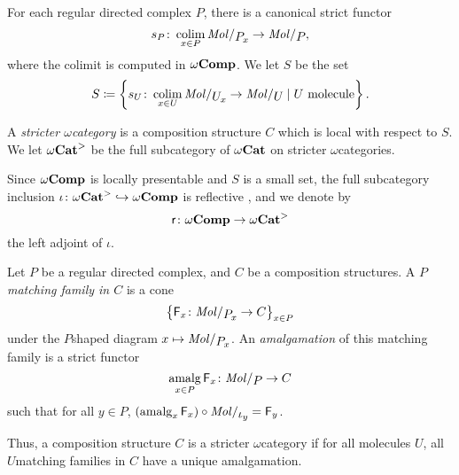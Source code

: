 \begin{dfn}
    For each regular directed complex \( P \), there is a canonical strict functor
    \begin{equation*}
        s_P \colon \colim_{x \in P} \molecin{\imel{P}{x}} \to \molecin{P},
    \end{equation*}
    where the colimit is computed in \( \omega\mathbf{Comp} \).
    We let \( S \) be the set
    \begin{equation*}
        S \eqdef \set{s_U \colon \colim_{x \in U} \molecin{\imel{U}{x}} \to \molecin{U} \mid U \text{ molecule}}.
    \end{equation*}
\end{dfn}

\begin{dfn}
    A \emph{stricter \( \omega \)\nbd category} is a composition structure \( C \) which is local with respect to \( S \).
    We let \( {\omega\mathbf{Cat}}^> \) be the full subcategory of \( {\omega\mathbf{Cat}} \) on stricter \( \omega \)\nbd categories.
\end{dfn}

\noindent Since \( \omega\mathbf{Comp} \) is locally presentable and \( S \) is a small set, the full subcategory inclusion \( \iota \colon {\omega\mathbf{Cat}}^> \hookrightarrow \omega\mathbf{Comp} \) is reflective \cite{freyd1972continuous}, and we denote by 
\begin{equation*}
    \mathsf{r} \colon \omega\mathbf{Comp} \to {\omega\mathbf{Cat}}^>
\end{equation*}
the left adjoint of \( \iota \).

\begin{dfn} 
    Let \( P \) be a regular directed complex, and \( C \) be a composition structures.
    A \emph{\( P \)\nbd matching family in \( C \)} is a cone 
    \begin{equation*}
        \set{\F_x \colon \molecin{\imel{P}{x}} \to C}_{x \in P}
    \end{equation*}
    under the \( P \)\nbd shaped diagram \( x \mapsto \molecin{\imel{P}{x}} \).    
    An \emph{amalgamation} of this matching family is a strict functor 
    \begin{equation*}
        \amalg_{x\in P} \F_x \colon \molecin{P} \to C
    \end{equation*}
    such that for all \( y \in P \), \( (\amalg_x \F_x) \after \molecin{\mapel{y}} = \F_y \).
\end{dfn}

\begin{rmk}
    Thus, a composition structure \( C \) is a stricter \( \omega \)\nbd category if for all molecules \( U \), all \( U \)\nbd matching families in \( C \) have a unique amalgamation.
\end{rmk}

